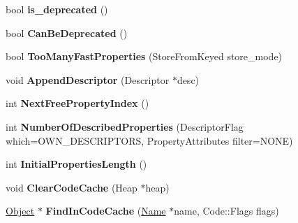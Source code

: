 \begin{DoxyCompactItemize}
\item 
\hypertarget{classv8_1_1internal_1_1_map_ad7d030c80109577f03d009e70ea751b9}{}bool {\bfseries is\+\_\+deprecated} ()\label{classv8_1_1internal_1_1_map_ad7d030c80109577f03d009e70ea751b9}

\item 
\hypertarget{classv8_1_1internal_1_1_map_abcdce15461b5d4ade1c73944abdeb38d}{}bool {\bfseries Can\+Be\+Deprecated} ()\label{classv8_1_1internal_1_1_map_abcdce15461b5d4ade1c73944abdeb38d}

\item 
\hypertarget{classv8_1_1internal_1_1_map_af3453cb7bd8c9b3c9c948d5ae212be86}{}bool {\bfseries Too\+Many\+Fast\+Properties} (Store\+From\+Keyed store\+\_\+mode)\label{classv8_1_1internal_1_1_map_af3453cb7bd8c9b3c9c948d5ae212be86}

\item 
\hypertarget{classv8_1_1internal_1_1_map_ae32014fe26612f64ed211e33f15d2925}{}void {\bfseries Append\+Descriptor} (Descriptor $\ast$desc)\label{classv8_1_1internal_1_1_map_ae32014fe26612f64ed211e33f15d2925}

\item 
\hypertarget{classv8_1_1internal_1_1_map_a6226e561bd8e9dcd09d3c432353cb535}{}int {\bfseries Next\+Free\+Property\+Index} ()\label{classv8_1_1internal_1_1_map_a6226e561bd8e9dcd09d3c432353cb535}

\item 
\hypertarget{classv8_1_1internal_1_1_map_a9656eb83a1c929a45e174ed09b1f3832}{}int {\bfseries Number\+Of\+Described\+Properties} (Descriptor\+Flag which=O\+W\+N\+\_\+\+D\+E\+S\+C\+R\+I\+P\+T\+O\+R\+S, Property\+Attributes filter=N\+O\+N\+E)\label{classv8_1_1internal_1_1_map_a9656eb83a1c929a45e174ed09b1f3832}

\item 
\hypertarget{classv8_1_1internal_1_1_map_aba0c4d4c2f701eacd062926f46a83ec4}{}int {\bfseries Initial\+Properties\+Length} ()\label{classv8_1_1internal_1_1_map_aba0c4d4c2f701eacd062926f46a83ec4}

\item 
\hypertarget{classv8_1_1internal_1_1_map_ae056fb96f948796beaa380733e704d30}{}void {\bfseries Clear\+Code\+Cache} (Heap $\ast$heap)\label{classv8_1_1internal_1_1_map_ae056fb96f948796beaa380733e704d30}

\item 
\hypertarget{classv8_1_1internal_1_1_map_ad7762a07b50fdfd44dfe3e7d2c10c690}{}\hyperlink{classv8_1_1internal_1_1_object}{Object} $\ast$ {\bfseries Find\+In\+Code\+Cache} (\hyperlink{classv8_1_1internal_1_1_name}{Name} $\ast$name, Code\+::\+Flags flags)\label{classv8_1_1internal_1_1_map_ad7762a07b50fdfd44dfe3e7d2c10c690}


\end{DoxyCompactItemize}
